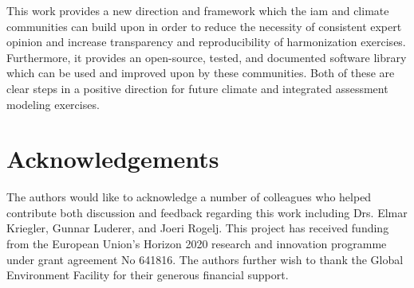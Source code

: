 \documentclass[review]{elsarticle}
\begin{document}
This work provides a new direction and framework which the \gls{iam} and climate
communities can build upon in order to reduce the necessity of consistent expert
opinion and increase transparency and reproducibility of harmonization
exercises. Furthermore, it provides an open-source, tested, and documented
software library which can be used and improved upon by these communities. Both
of these are clear steps in a positive direction for future climate and
integrated assessment modeling exercises.

\section*{Acknowledgements}

The authors would like to acknowledge a number of colleagues who helped
contribute both discussion and feedback regarding this work including Drs. Elmar
Kriegler, Gunnar Luderer, and Joeri Rogelj. This project has received funding
from the European Union’s Horizon 2020 research and innovation programme under
grant agreement No 641816. The authors further wish to thank the Global
Environment Facility for their generous financial support.

\newpage
\printglossaries

\newpage
\section*{\refname}

\end{document}
